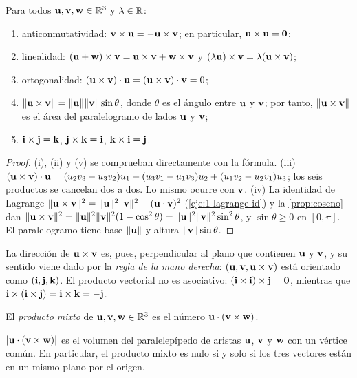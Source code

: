 \begin{proposicion}\label{prop:vectorial}
Para todos $\mathbf{u},\mathbf{v},\mathbf{w}\in\mathbb{R}^3$ y $\lambda\in\mathbb{R}$:
\begin{enumerate}
  \item anticonmutatividad: $\mathbf{v}\times\mathbf{u}=-\mathbf{u}\times\mathbf{v}$; en particular, $\mathbf{u}\times\mathbf{u}=\mathbf{0}$;
  \item linealidad: $(\mathbf{u}+\mathbf{w})\times\mathbf{v}=\mathbf{u}\times\mathbf{v}+\mathbf{w}\times\mathbf{v}$ y $(\lambda\mathbf{u})\times\mathbf{v}=\lambda(\mathbf{u}\times\mathbf{v})$;
  \item ortogonalidad: $(\mathbf{u}\times\mathbf{v})\cdot\mathbf{u}=(\mathbf{u}\times\mathbf{v})\cdot\mathbf{v}=0$;
  \item $\lVert\mathbf{u}\times\mathbf{v}\rVert=\lVert\mathbf{u}\rVert\lVert\mathbf{v}\rVert\sin\theta$, donde $\theta$ es el ángulo entre $\mathbf{u}$ y $\mathbf{v}$; por tanto, $\lVert\mathbf{u}\times\mathbf{v}\rVert$ es el área del paralelogramo de lados $\mathbf{u}$ y $\mathbf{v}$;
  \item $\mathbf{i}\times\mathbf{j}=\mathbf{k}$, $\mathbf{j}\times\mathbf{k}=\mathbf{i}$, $\mathbf{k}\times\mathbf{i}=\mathbf{j}$.
\end{enumerate}
\end{proposicion}

\begin{proof}
(i), (ii) y (v) se comprueban directamente con la fórmula. (iii) $(\mathbf{u}\times\mathbf{v})\cdot\mathbf{u}=(u_2v_3-u_3v_2)u_1+(u_3v_1-u_1v_3)u_2+(u_1v_2-u_2v_1)u_3$; los seis productos se cancelan dos a dos. Lo mismo ocurre con $\mathbf{v}$. (iv) La identidad de Lagrange $\lVert\mathbf{u}\times\mathbf{v}\rVert^2=\lVert\mathbf{u}\rVert^2\lVert\mathbf{v}\rVert^2-(\mathbf{u}\cdot\mathbf{v})^2$ (\cref{eje:1-lagrange-id}) y la \cref{prop:coseno} dan $\lVert\mathbf{u}\times\mathbf{v}\rVert^2=\lVert\mathbf{u}\rVert^2\lVert\mathbf{v}\rVert^2(1-\cos^2\theta)=\lVert\mathbf{u}\rVert^2\lVert\mathbf{v}\rVert^2\sin^2\theta$, y $\sin\theta\ge0$ en $[0,\pi]$. El paralelogramo tiene base $\lVert\mathbf{u}\rVert$ y altura $\lVert\mathbf{v}\rVert\sin\theta$.
\end{proof}

La dirección de $\mathbf{u}\times\mathbf{v}$ es, pues, perpendicular al plano que contienen $\mathbf{u}$ y $\mathbf{v}$, y su sentido viene dado por la \emph{regla de la mano derecha}: $(\mathbf{u},\mathbf{v},\mathbf{u}\times\mathbf{v})$ está orientado como $(\mathbf{i},\mathbf{j},\mathbf{k})$. El producto vectorial no es asociativo: $(\mathbf{i}\times\mathbf{i})\times\mathbf{j}=\mathbf{0}$, mientras que $\mathbf{i}\times(\mathbf{i}\times\mathbf{j})=\mathbf{i}\times\mathbf{k}=-\mathbf{j}$.

\begin{definicion}\label{def:mixto}
El \emph{producto mixto} de $\mathbf{u},\mathbf{v},\mathbf{w}\in\mathbb{R}^3$ es el número $\mathbf{u}\cdot(\mathbf{v}\times\mathbf{w})$.
\end{definicion}

\begin{proposicion}[Volumen]\label{prop:volumen}
$\lvert\mathbf{u}\cdot(\mathbf{v}\times\mathbf{w})\rvert$ es el volumen del paralelepípedo de aristas $\mathbf{u}$, $\mathbf{v}$ y $\mathbf{w}$ con un vértice común. En particular, el producto mixto es nulo si y solo si los tres vectores están en un mismo plano por el origen.
\end{proposicion}

